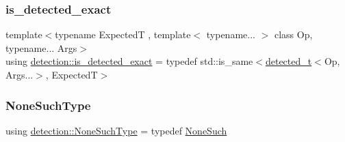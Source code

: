 \mbox{\label{namespacedetection_affc661f546e50448d9582e54280f7a11}} 
\subsubsection{\texorpdfstring{is\+\_\+detected\+\_\+exact}{is\_detected\_exact}}
{\footnotesize\ttfamily template$<$typename ExpectedT , template$<$ typename... $>$ class Op, typename... Args$>$ \\
using \hyperlink{namespacedetection_affc661f546e50448d9582e54280f7a11}{detection\+::is\+\_\+detected\+\_\+exact} = typedef std\+::is\+\_\+same$<$\hyperlink{namespacedetection_a25bd8500c8667f0015e88f9d26cca271}{detected\+\_\+t}$<$Op, Args...$>$, ExpectedT$>$}

\mbox{\label{namespacedetection_a08288d9ae2ffab86bb82bbdd27fbf77b}} 
\subsubsection{\texorpdfstring{None\+Such\+Type}{NoneSuchType}}
{\footnotesize\ttfamily using \hyperlink{namespacedetection_a08288d9ae2ffab86bb82bbdd27fbf77b}{detection\+::\+None\+Such\+Type} = typedef \hyperlink{structdetection_1_1_none_such}{None\+Such}}

